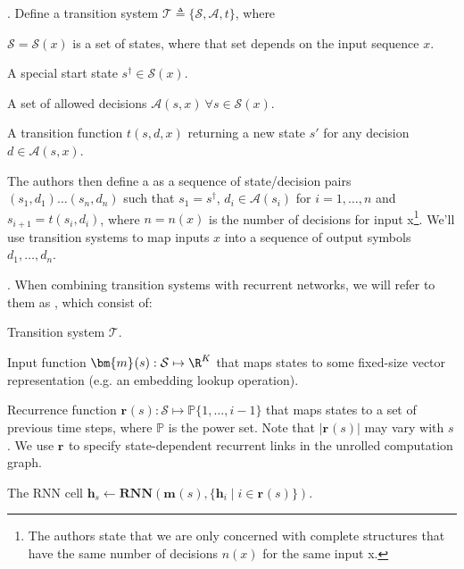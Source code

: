 \documentclass[11pt]{article}
\renewcommand\vec[2][]{\bm{#2}_{#1}}
\newcommand\myspace[1][]{\vspace{#1\bigskipamount}}
\newcommand\p{\Needspace{10\baselineskip} \noindent}
\begin{document}
\p {}. Define a transition system $\mathcal{T} \triangleq \{ \mathcal{S}, \mathcal{A}, t \}$, where
\begin{compactitem}
	\item $\mathcal{S} = \mathcal{S}(x)$ is a set of states, where that set depends on the input sequence $x$.
	\item A special start state $s^{\dagger} \in \mathcal{S}(x)$.
	\item A set of allowed decisions $\mathcal{A}(s, x) ~ \forall s \in \mathcal{S}(x)$.
	\item A transition function $t(s, d, x)$ returning a new state $s'$ for any decision $d \in \mathcal{A}(s, x)$.  
\end{compactitem}
The authors then define a  as a sequence of state/decision pairs $(s_1, d_1)\ldots(s_n, d_n)$ such that $s_1 = s^{\dagger}$, $d_i \in \mathcal{A}(s_i)$ for $i = 1, \ldots, n$ and $s_{i+1} = t(s_i, d_i)$, where $n = n(x)$ is the number of decisions for input x\footnote{The authors state that we are only concerned with complete structures that have the same number of decisions $n(x)$ for the same input x.}. We'll use transition systems to map inputs $x$ into a sequence of output symbols $d_1, \ldots, d_n$. 

\myspace
\p {}. When combining transition systems with recurrent networks, we will refer to them as , which consist of:
\begin{compactitem}
	\item Transition system $\mathcal{T}$. 
	\item Input function $\vec{m}(s): \mathcal{S} \mapsto \R^K$ that maps states to some fixed-size vector representation (e.g. an embedding lookup operation). 
	\item Recurrence function $\vec{r}(s) : \mathcal{S} \mapsto \mathbb{P}\{ 1, \ldots, i - 1 \}$ that maps states to a set of previous time steps, where $\mathbb{P}$ is the power set. Note that $|\vec{r}(s)|$ may vary with $s$. We use $\vec{r}$ to specify state-dependent recurrent links in the unrolled computation graph. 
	\item The RNN cell $\vec[s]{h} \leftarrow \mathbf{RNN}(\vec{m}(s), \{ \vec[i]{h} \mid i \in \vec{r}(s) \})$. 
\end{compactitem}
\end{document}
